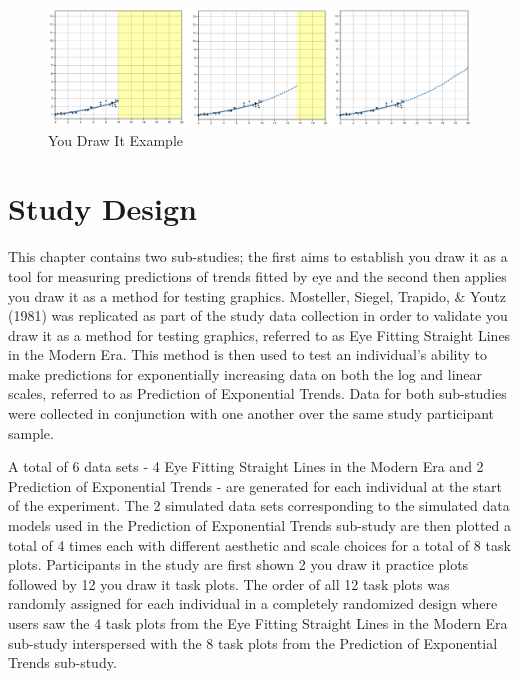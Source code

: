 \documentclass[print]{nuthesis}
\begin{document}
\begin{figure}[tbp]

{\centering \includegraphics[width=1\linewidth,]{images/ydiExample-0.10-10-linear} 

}

\caption{You Draw It Example}\label{fig:youdrawit-example}
\end{figure}

\hypertarget{study-design-1}{%
\section{Study Design}\label{study-design-1}}

This chapter contains two sub-studies; the first aims to establish you draw it as a tool for measuring predictions of trends fitted by eye and the second then applies you draw it as a method for testing graphics.
Mosteller, Siegel, Trapido, \& Youtz (1981) was replicated as part of the study data collection in order to validate you draw it as a method for testing graphics, referred to as Eye Fitting Straight Lines in the Modern Era.
This method is then used to test an individual's ability to make predictions for exponentially increasing data on both the log and linear scales, referred to as Prediction of Exponential Trends.
Data for both sub-studies were collected in conjunction with one another over the same study participant sample.

A total of 6 data sets - 4 Eye Fitting Straight Lines in the Modern Era and 2 Prediction of Exponential Trends - are generated for each individual at the start of the experiment.
The 2 simulated data sets corresponding to the simulated data models used in the Prediction of Exponential Trends sub-study are then plotted a total of 4 times each with different aesthetic and scale choices for a total of 8 task plots.
Participants in the study are first shown 2 you draw it practice plots followed by 12 you draw it task plots.
The order of all 12 task plots was randomly assigned for each individual in a completely randomized design where users saw the 4 task plots from the Eye Fitting Straight Lines in the Modern Era sub-study interspersed with the 8 task plots from the Prediction of Exponential Trends sub-study.
\end{document}
